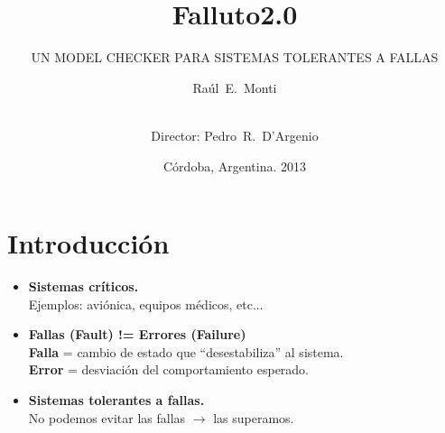 \documentclass[serif]{beamer}
\title[\Falluto20] %
{Falluto2.0}
\subtitle{ UN MODEL CHECKER PARA SISTEMAS TOLERANTES A FALLAS}
\author[Monti] %
{Raúl~E.~Monti \and\\ Director: Pedro~R.~D'Argenio}
\institute[FaMAF - UNC] %
{
Facultad de Matem\'atica, Astronom\'ia y F\'isica, Universidad Nacional de 
Córdoba
}
\date[4-2-2013] %
{Córdoba, Argentina. 2013}
\begin{document}
\frame{\titlepage}


\section[Intro]{Introducción}


\begin{frame}
\begin{itemize}\itemsep15pt
\item {\Large \bfseries Sistemas críticos.}\\[5pt]
\hspace{0.5cm}Ejemplos: aviónica, equipos médicos, etc...
\item {\Large \bfseries Fallas (Fault) != Errores (Failure)}\\[5pt]
\hspace{0.5cm}\textbf{Falla} = cambio de estado que ``desestabiliza'' al sistema.\\[5pt]
\hspace{0.5cm}\textbf{Error} = desviación del comportamiento esperado.
\item {\Large \bfseries Sistemas tolerantes a fallas.}\\[5pt]
\hspace{0.5cm}No podemos evitar las fallas $\longrightarrow$ las superamos.
\end{itemize}
\end{frame}
\end{document}
